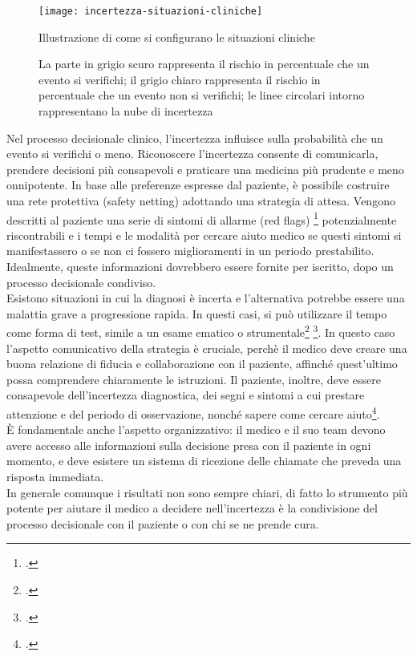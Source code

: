\begin{figure}[!ht] 
    \centering 
    \texttt{[image: incertezza-situazioni-cliniche]} 
    \caption{Illustrazione di come si configurano le situazioni cliniche}
    \caption*{La parte in grigio scuro rappresenta il rischio in percentuale che un evento si verifichi; il grigio chiaro rappresenta il rischio in percentuale che un evento non si verifichi; le linee circolari intorno rappresentano la nube di incertezza}
    \label{fig:incertezza-situazioni-cliniche}
\end{figure}


Nel processo decisionale clinico, l'incertezza influisce sulla probabilità che un evento si verifichi o meno. Riconoscere l'incertezza consente di comunicarla, prendere decisioni più consapevoli e praticare una medicina più prudente e meno onnipotente.
In base alle preferenze espresse dal paziente, è possibile costruire una rete protettiva (safety netting) adottando una strategia di attesa. Vengono descritti al paziente una serie di sintomi di allarme (red flags) \footcite{womak:recenti-progressi-medicina} potenzialmente riscontrabili e i tempi e le modalità per cercare aiuto medico se questi sintomi si manifestassero o se non ci fossero miglioramenti in un periodo prestabilito. Idealmente, queste informazioni dovrebbero essere fornite per iscritto, dopo un processo decisionale condiviso.\\

Esistono situazioni in cui la diagnosi è incerta e l'alternativa potrebbe essere una malattia grave a progressione rapida. In questi casi, si può utilizzare il tempo come forma di test, simile a un esame ematico o strumentale\footcite{womak:recenti-progressi-medicina} \footcite{womak:strategie-nella-diagnostica}. In questo caso l'aspetto comunicativo della strategia è cruciale, perchè il medico deve creare una buona relazione di fiducia e collaborazione con il paziente, affinché quest'ultimo possa comprendere chiaramente le istruzioni. Il paziente, inoltre, deve essere consapevole dell'incertezza diagnostica, dei segni e sintomi a cui prestare attenzione e del periodo di osservazione, nonché sapere come cercare aiuto\footcite{womak:arte-probabilita-coen}.\\
È fondamentale anche l'aspetto organizzativo: il medico e il suo team devono avere accesso alle informazioni sulla decisione presa con il paziente in ogni momento, e deve esistere un sistema di ricezione delle chiamate che preveda una risposta immediata.\\
In generale comunque i risultati non sono sempre chiari, di fatto lo strumento più potente per aiutare il medico a decidere nell'incertezza è la condivisione del processo decisionale con il paziente o con chi se ne prende cura.\\

